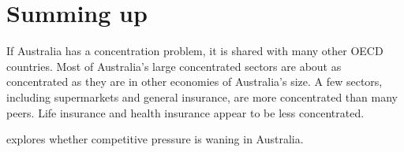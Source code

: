 \section{Summing up}

If Australia has a concentration problem, it is shared with many other OECD countries. Most of Australia's large concentrated sectors are about as concentrated as they are in other economies of Australia's size. A few sectors, including supermarkets and general insurance, are more concentrated than many peers. Life insurance and health insurance appear to be less concentrated.

 explores whether competitive pressure is waning in Australia.

